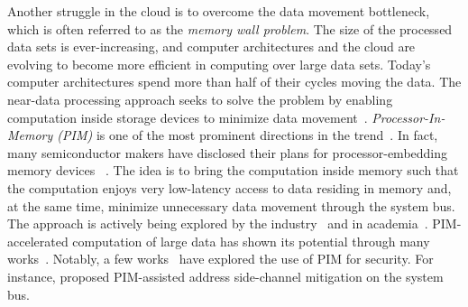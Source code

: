 Another struggle in the cloud is to overcome the data movement bottleneck, which is often referred to as the \emph{memory wall problem}. The size of the processed data sets is ever-increasing, and computer architectures and the cloud are evolving to become more efficient in computing over large data sets. Today's computer architectures spend more than half of their cycles moving the data. The near-data processing approach seeks to solve the problem by enabling computation inside storage devices to minimize data movement~\cite{ndp-framework,near-data-uncore, computing-with-near-data}. \emph{Processor-In-Memory (PIM)} is one of the most prominent directions in the trend~\cite{enabling-practical-pim,lazypim,ndp-framework,in-memory-parallel}. In fact, many semiconductor makers have disclosed their plans for processor-embedding memory devices ~\cite{samsung-pim,amd-hbm}. The idea is to bring the computation inside memory such that the computation enjoys very low-latency access to data residing in memory and, at the same time, minimize unnecessary data movement through the system bus. The approach is actively being explored by the industry~\cite{samsung-pim,upmem} and in academia~\cite{tesseract,pei,smcsim,enabling-practical-pim,lazypim}. PIM-accelerated computation of large data has shown its potential through many works~\cite{nda,prime, chameleon, mr-ndc, tesseract,pei, graphpim}. Notably, a few works~\cite{invisimem,obfusmem,hega,sdimm,near-data-security} have explored the use of PIM for security. For instance, \cite{invisimem,obfusmem} proposed PIM-assisted address side-channel mitigation on the system bus. 



